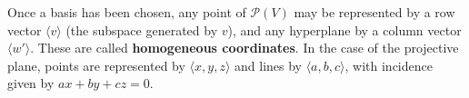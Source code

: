 Once a basis has been chosen, any point of $\mathcal{P}(V)$ may be represented by a row vector $\langle v \rangle$ (the subspace generated by $v$), and any hyperplane by a column vector $\langle w' \rangle$. These are called \textbf{homogeneous coordinates}. In the case of the projective plane, points are represented by $\langle x, y, z \rangle$ and lines by $\langle a, b, c \rangle$, with incidence given by $ax + by + cz = 0$.
